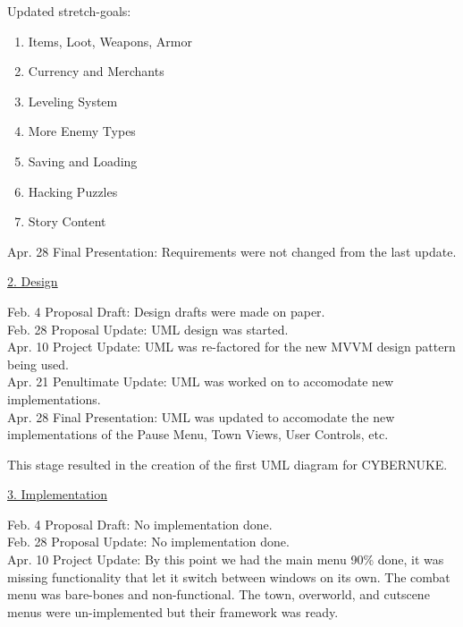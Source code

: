 \documentclass[10pt,conference,onecolumn,compsoc]{IEEEtran}
\begin{document}
Updated stretch-goals:
\begin{enumerate}
\item Items, Loot, Weapons, Armor
\item Currency and Merchants
\item Leveling System
\item More Enemy Types
\item Saving and Loading
\item Hacking Puzzles
\item Story Content\\
\end{enumerate}

Apr. 28 Final Presentation: 
Requirements were not changed from the last update.

\vspace{5px}
\underline{2. Design}
\vspace{5px}

Feb. 4 Proposal Draft: Design drafts were made on paper.\\

Feb. 28 Proposal Update: UML design was started.\\

Apr. 10 Project Update: UML was re-factored for the new MVVM design pattern being used.\\

Apr. 21 Penultimate Update: UML was worked on to accomodate new implementations.\\

Apr. 28 Final Presentation: UML was updated to accomodate the new implementations of the Pause Menu, Town Views, User Controls, etc.


This stage resulted in the creation of the first UML diagram for CYBERNUKE.

\vspace{5px}
\underline{3. Implementation}
\vspace{5px}

Feb. 4 Proposal Draft: No implementation done.\\

Feb. 28 Proposal Update: No implementation done.\\

Apr. 10 Project Update: By this point we had the main menu 90\% done, it was missing functionality that let it switch between windows on its own. The combat menu was bare-bones and non-functional. The town, overworld, and cutscene menus were un-implemented but their framework was ready.\\
\end{document}
